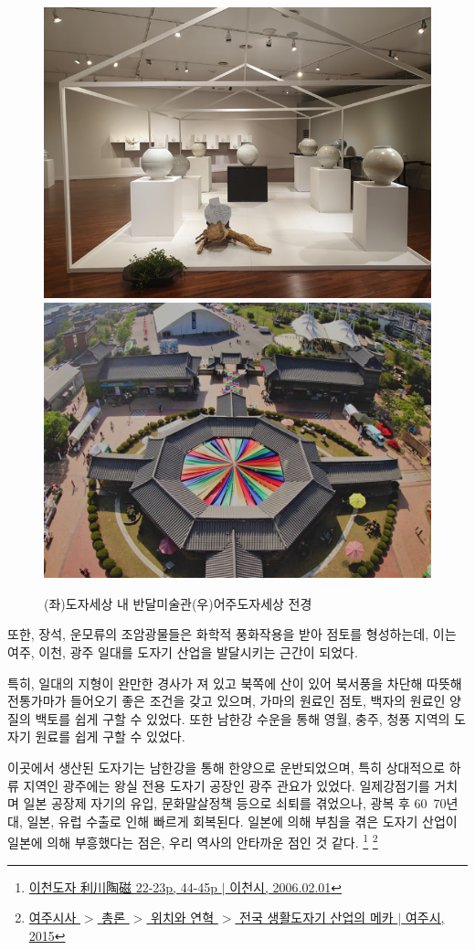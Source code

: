 \documentclass[chapter, oneside]{oblivoir}
\begin{document}
 \begin{figure}
    \centering
    \includegraphics[width=.45\textwidth]{img/도자전.jpg}
    \includegraphics[width=.45\textwidth]{img/여주도자세상.jpg}
    \caption{(좌)도자세상 내 반달미술관\protect\footnotemark (우)어주도자세상 전경\protect\footnotemark}
    \label{fig:my_labe3}
\end{figure}

또한, 장석, 운모류의 조암광물들은 화학적 풍화작용을 받아 점토를 형성하는데,
이는  여주, 이천, 광주 일대를 도자기 산업을 발달시키는 근간이 되었다.

특히, 일대의 지형이 완만한 경사가 져 있고
북쪽에 산이 있어 북서풍을 차단해 따뜻해 전통가마가 들어오기 좋은 조건을 갖고 있으며,
가마의 원료인 점토, 백자의 원료인 양질의 백토를 쉽게 구할 수 있었다.
또한 남한강 수운을 통해 영월, 충주, 청풍 지역의 도자기 원료를 쉽게 구할 수 있었다.

이곳에서 생산된 도자기는 남한강을 통해 한양으로 운반되었으며,
특히 상대적으로 하류 지역인 광주에는 왕실 전용 도자기 공장인 광주 관요가 있었다.
일제강점기를 거치며 일본 공장제 자기의 유입, 문화말살정책 등으로 쇠퇴를 겪었으나,
광복 후 60~70년대, 일본, 유럽 수출로 인해 빠르게 회복된다.
일본에 의해 부침을 겪은 도자기 산업이 일본에 의해 부흥했다는 점은, 우리 역사의 안타까운 점인 것 같다.
\footnote{\href{https://memory.library.kr/items/show/37951}{이천도자 利川陶磁 22-23p, 44-45p $|$ 이천시, 2006.02.01}}
\footnote{ \href{https://www.yeoju.go.kr/history/main.jsp}{여주시사 $>$ 총론 $>$ 위치와 연혁 $>$ 전국 생활도자기 산업의 메카 $|$ 여주시, 2015}}
\end{document}
